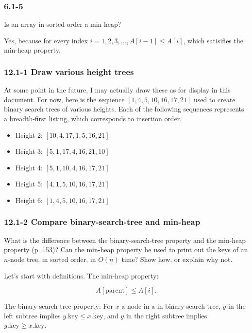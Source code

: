 \documentclass{article}
\begin{document}
\subsubsection{6.1-5} Is an array in sorted order a min-heap?

Yes, because for every index $i = 1, 2, 3,\ldots, A[i-1] \leq A[i]$,
which satisifies the min-heap property.

\subsubsection{12.1-1 Draw various height trees}

At some point in the future, I may actually draw these as for
display in this document. For now, here is the sequence
$[1, 4, 5, 10, 16, 17, 21]$ used to create binary search trees
of various heights. Each of the following sequences represents
a breadth-first listing, which corresponds to insertion order.

\begin{itemize}
  \item Height 2: $[10, 4, 17, 1, 5, 16, 21]$
  \item Height 3: $[5, 1, 17, 4, 16, 21, 10]$
  \item Height 4: $[5, 1, 10, 4, 16, 17, 21]$
  \item Height 5: $[4, 1, 5, 10, 16, 17, 21]$
  \item Height 6: $[1, 4, 5, 10, 16, 17, 21]$
\end{itemize}

\subsubsection{12.1-2 Compare binary-search-tree and min-heap}

What is the difference between the binary-search-tree property and the min-heap
property (p. 153)? Can the min-heap property be used to print out the keys of
an $n$-node tree, in sorted order, in $O(n)$ time?  Show how, or explain why
not.

Let's start with definitions.
The min-heap property:

\begin{equation}
  A[\mathrm{parent}] \leq A[i].
\end{equation}

The binary-search-tree property: For $x$ a node in a in binary search tree,
$y$ in the left subtree implies $y.\mathrm{key} \leq x.\mathrm{key}$, and
$y$ in the right subtree implies $y.\mathrm{key} \geq x.\mathrm{key}$.
\end{document}
